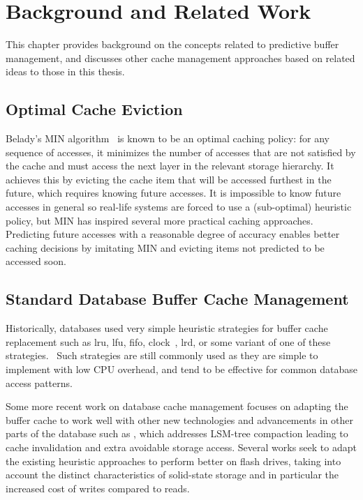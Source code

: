 
\chapter{Background and Related Work}
\label{ch:background}

This chapter provides background on the concepts related to predictive buffer management, and discusses other cache management approaches based on related ideas to those in this thesis.

\section{Optimal Cache Eviction}

Belady's MIN algorithm~\cite{beladyMIN} is known to be an optimal caching policy: for any sequence of accesses, it minimizes the number of accesses that are not satisfied by the cache and must access the next layer in the relevant storage hierarchy. It achieves this by evicting the cache item that will be accessed furthest in the future, which requires knowing future accesses. It is impossible to know future accesses in general so real-life systems are forced to use a (sub-optimal) heuristic policy, but MIN has inspired several more practical caching approaches. Predicting future accesses with a reasonable degree of accuracy enables better caching decisions by imitating MIN and evicting items not predicted to be accessed soon.


\section{Standard Database Buffer Cache Management}

Historically, databases used very simple heuristic strategies for buffer cache replacement such as \gls{lru}, \gls{lfu}, \gls{fifo}, clock~\cite{gclock}, \gls{lrd}, or some variant of one of these strategies.~\cite{effelsberg1984principles,hull1988buffer,feng1998study} Such strategies are still commonly used as they are simple to implement with low CPU overhead, and tend to be effective for common database access patterns.

Some more recent work on database cache management focuses on adapting the buffer cache to work well with other new technologies and advancements in other parts of the database such as \cite{teng2017lsbm}, which addresses LSM-tree compaction leading to cache invalidation and extra avoidable storage access. Several works seek to adapt the existing heuristic approaches to perform better on flash drives, taking into account the distinct characteristics of solid-state storage and in particular the increased cost of writes compared to reads. \cite{ou2009cfdc,lv2011operation,jiang2015cost,hu2010pud,jin2012ad}


